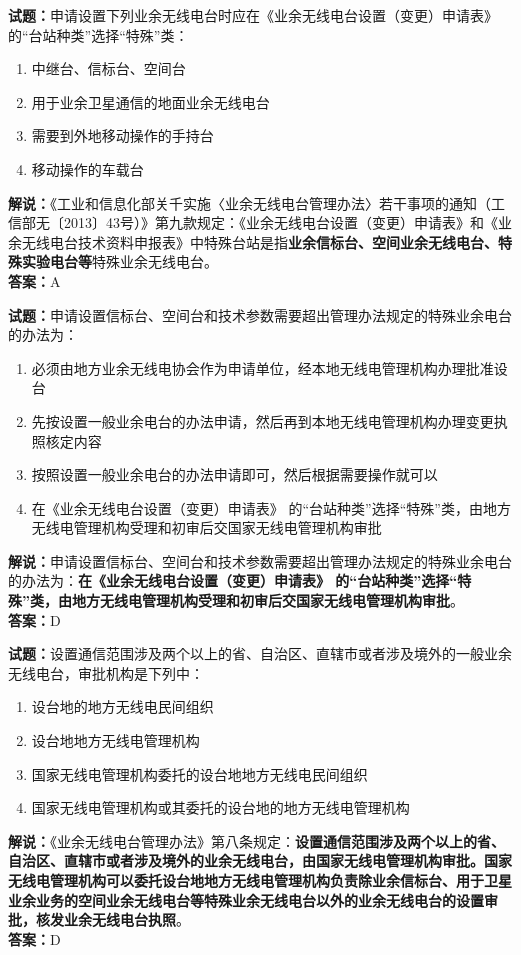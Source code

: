 \documentclass{ctexbook}
\begin{document}
\bigskip


\noindent\textbf{试题：}申请设置下列业余无线电台时应在《业余无线电台设置（变更）申请表》 的“台站种类”选择“特殊”类：
\begin{enumerate}[leftmargin=3em]
\item 中继台、信标台、空间台
\item 用于业余卫星通信的地面业余无线电台
\item 需要到外地移动操作的手持台
\item 移动操作的车载台
\end{enumerate}
\noindent\textbf{解说：}《工业和信息化部关千实施〈业余无线电台管理办法〉若干事项的通知（工信部无〔2013〕43号）》第九款规定：《业余无线电台设置（变更）申请表》和《业余无线电台技术资料申报表》中特殊台站是指\textbf{业余信标台、空间业余无线电台、特殊实验电台等}特殊业余无线电台。\\\noindent\textbf{答案：}A




\bigskip


\noindent\textbf{试题：}申请设置信标台、空间台和技术参数需要超出管理办法规定的特殊业余电台的办法为：
\begin{enumerate}[leftmargin=3em]
\item 必须由地方业余无线电协会作为申请单位，经本地无线电管理机构办理批准设台
\item 先按设置一般业余电台的办法申请，然后再到本地无线电管理机构办理变更执照核定内容
\item 按照设置一般业余电台的办法申请即可，然后根据需要操作就可以
\item 在《业余无线电台设置（变更）申请表》 的“台站种类”选择“特殊”类，由地方无线电管理机构受理和初审后交国家无线电管理机构审批
\end{enumerate}
\noindent\textbf{解说：}申请设置信标台、空间台和技术参数需要超出管理办法规定的特殊业余电台的办法为：\textbf{在《业余无线电台设置（变更）申请表》 的“台站种类”选择“特殊”类，由地方无线电管理机构受理和初审后交国家无线电管理机构审批}。\\\noindent\textbf{答案：}D



\bigskip


\noindent\textbf{试题：}设置通信范围涉及两个以上的省、自治区、直辖市或者涉及境外的一般业余无线电台，审批机构是下列中：
\begin{enumerate}[leftmargin=3em]
\item 设台地的地方无线电民间组织
\item 设台地地方无线电管理机构
\item 国家无线电管理机构委托的设台地地方无线电民间组织
\item 国家无线电管理机构或其委托的设台地的地方无线电管理机构
\end{enumerate}
\noindent\textbf{解说：}《业余无线电台管理办法》第八条规定：\textbf{设置通信范围涉及两个以上的省、自治区、直辖市或者涉及境外的业余无线电台，由国家无线电管理机构审批。国家无线电管理机构可以委托设台地地方无线电管理机构负责除业余信标台、用于卫星业余业务的空间业余无线电台等特殊业余无线电台以外的业余无线电台的设置审批，核发业余无线电台执照}。\\\noindent\textbf{答案：}D
\end{document}

